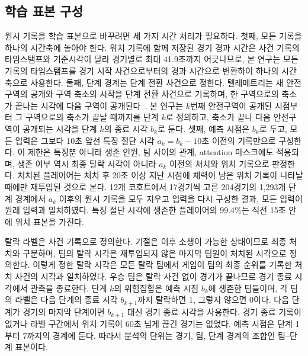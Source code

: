 \subsection{학습 표본 구성}
\label{sec:data:samples}

원시 기록을 학습 표본으로 바꾸려면 세 가지 시간 처리가 필요하다.
첫째, 모든 기록을 하나의 시간축에 놓아야 한다.
위치 기록에 함께 저장된 경기 경과 시간은 사건 기록의 타임스탬프와 기준시각이 달라 경기별로 최대 41.9초까지 어긋나므로, 본 연구는 모든 기록의 타임스탬프를 경기 시작 사건으로부터의 경과 시간으로 변환하여 하나의 시간축으로 사용한다.
둘째, 단계 경계는 단계 전환 사건으로 정한다.
텔레메트리는 새 안전구역의 공개와 구역 축소의 시작을 단계 전환 사건으로 기록하며, 한 구역으로의 축소가 끝나는 시각에 다음 구역이 공개된다~\cite{PUBGAPI}.
본 연구는 $k$번째 안전구역이 공개된 시점부터 그 구역으로의 축소가 끝날 때까지를 단계 $k$로 정의하고, 축소가 끝나 다음 안전구역이 공개되는 시각을 단계 $k$의 종료 시각 $b_k$로 둔다.
셋째, 예측 시점은 $b_k$로 두고, 모든 입력은 그보다 10초 앞선 특징 절단 시각 $a_k=b_k-10$초 이전의 기록만으로 구성한다.
이 제한은 특징뿐 아니라 생존 인원, 팀 사이의 관계, attention 마스크에도 적용되며, 생존 여부 역시 최종 탈락 시각이 아니라 $a_k$ 이전의 처치와 위치 기록으로 판정한다.
처치된 플레이어는 처치 후 20초 이상 지난 시점에 체력이 남은 위치 기록이 나타날 때에만 재투입된 것으로 본다.
12개 코호트에서 17경기씩 고른 204경기의 1,293개 단계 경계에서 $a_k$ 이후의 원시 기록을 모두 지우고 입력을 다시 구성한 결과, 모든 입력이 원래 입력과 일치하였다.
특징 절단 시각에 생존한 플레이어의 99.4\%는 직전 15초 안에 위치 표본을 가진다.

탈락 라벨은 사건 기록으로 정의한다.
기절은 이후 소생이 가능한 상태이므로 최종 처치와 구분하며, 팀의 탈락 시각은 재투입되지 않은 마지막 팀원이 처치된 시각으로 정의한다.
이렇게 정한 탈락 시각은 모든 탈락 팀에서 게임이 팀의 최종 순위를 기록한 처치 사건의 시각과 일치하였다.
우승 팀은 탈락 사건 없이 경기가 끝나므로 경기 종료 시각에서 관측을 종료한다.
단계 $k$의 위험집합은 예측 시점 $b_k$에 생존한 팀들이며, 각 팀의 라벨은 다음 단계의 종료 시각 $b_{k+1}$까지 탈락하면 1, 그렇지 않으면 0이다.
다음 단계가 경기의 마지막 단계이면 $b_{k+1}$ 대신 경기 종료 시각을 사용한다.
경기 종료 기록이 없거나 라벨 구간에서 위치 기록이 60초 넘게 끊긴 경기는 없었다.
예측 시점은 단계 1부터 7까지의 경계에 둔다.
따라서 분석의 단위는 경기, 팀, 단계 경계의 조합인 팀--단계 표본이다.

